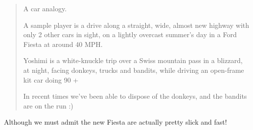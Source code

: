 \documentclass[
 11pt,
 twoside,
 a4paper,
 final                                 %
]{article}
\begin{document}
   \begin{quotation}
      A car analogy.

      A sample player is a drive along a straight, wide, almost new highway
      with only 2 other cars in sight, on a lightly overcast summer's day in a
      Ford Fiesta at around 40 MPH.

      Yoshimi is a white-knuckle trip over a Swiss mountain pass in a blizzard,
      at night, facing donkeys, trucks and bandits, while driving an open-frame
      kit car doing 90 +

      In recent times we've been able to dispose of the donkeys, and the
      bandits are on the run :)
   \end{quotation}

   Although we must admit the new Fiesta are actually pretty slick and fast!




\printindex
\end{document}
